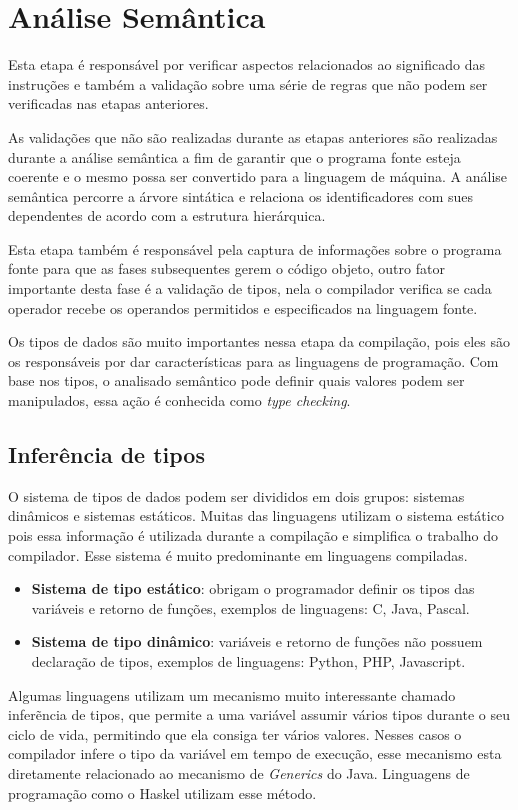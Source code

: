 \section{Análise Semântica} 

Esta etapa é responsável por verificar aspectos relacionados ao significado das instruções e também a validação sobre uma série de regras que não podem ser verificadas nas etapas anteriores.

As validações que não são realizadas durante as etapas anteriores são realizadas durante a análise semântica a fim de garantir que o programa fonte esteja coerente e o mesmo possa ser convertido para a linguagem de máquina.
A análise semântica percorre a árvore sintática e relaciona os identificadores com sues dependentes de acordo com a estrutura hierárquica.

Esta etapa também é responsável pela captura de informações sobre o programa fonte para que as fases subsequentes gerem o código objeto,
outro fator importante desta fase é a validação de tipos,
nela o compilador verifica se cada operador recebe os operandos permitidos e especificados na linguagem fonte.

Os tipos de dados são muito importantes nessa etapa da compilação, pois eles são os responsáveis por dar características para as linguagens de programação.
Com base nos tipos, o analisado semântico pode definir quais valores podem ser manipulados, essa ação é conhecida como \emph{type checking}.

\subsection{Inferência de tipos}

O sistema de tipos de dados podem ser divididos em dois grupos: sistemas dinâmicos e sistemas estáticos.
Muitas das linguagens utilizam o sistema estático pois essa informação é utilizada durante a compilação e simplifica o trabalho do compilador.
Esse sistema é muito predominante em linguagens compiladas.

\begin{itemize}
  \item \textbf{Sistema de tipo estático}: obrigam o programador definir os tipos das variáveis e retorno de funções, exemplos de linguagens: C, Java, Pascal.
  \item \textbf{Sistema de tipo dinâmico}: variáveis e retorno de funções não possuem declaração de tipos, exemplos de linguagens: Python, PHP, Javascript.
\end{itemize}

Algumas linguagens utilizam um mecanismo muito interessante chamado inferẽncia de tipos,
que permite a uma variável assumir vários tipos durante o seu ciclo de vida, permitindo que ela consiga ter vários valores.
Nesses casos o compilador infere o tipo da variável em tempo de execução, esse mecanismo esta diretamente relacionado ao mecanismo de \emph{Generics} do Java.
Linguagens de programação como o Haskel utilizam esse método.
